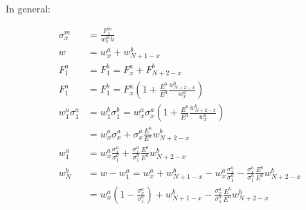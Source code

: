 In general:

\begin{align*}
	\sigma_x^m &= \frac{F_x^m}{w_x^m h}\\
	w &= w_x^a + w_{N+1-x}^b \\
	F_1^a &= F_1^b = F_x^a + F_{N+2-x}^b \\
	F_1^a &= F_1^b %
	= F_x^a \left( 1 + \frac{E^b}{E^a} \frac{w^b_{N+2-x}}{w^a_x} \right) \\
	w_1^a \sigma_1^a &= w_1^b \sigma_1^b = w_x^a \sigma_x^a \left( 1 + \frac{E^b}{E^a} \frac{w^b_{N+2-x}}{w^a_x} \right) \\
	&= w_x^a \sigma_x^a + \sigma_x^a \frac{E^b}{E^a} w^b_{N+2-x} \\
	w_1^a &= w_x^a \frac{\sigma_x^a}{\sigma_1^a} + \frac{\sigma_x^a}{\sigma_1^a} \frac{E^b}{E^a} w^b_{N+2-x} \\
	w_N^b &= w - w_1^a =  w_x^a + w_{N+1-x}^b  -  w_x^a \frac{\sigma_x^a}{\sigma_1^a} - \frac{\sigma_x^a}{\sigma_1^a} \frac{E^b}{E^a} w^b_{N+2-x} \\
	&= w_x^a \left( 1 - \frac{\sigma_x^a}{\sigma_1^a} \right) + w_{N+1-x}^b - \frac{\sigma_x^a}{\sigma_1^a} \frac{E^b}{E^a} w^b_{N+2-x} \\
\end{align*}

